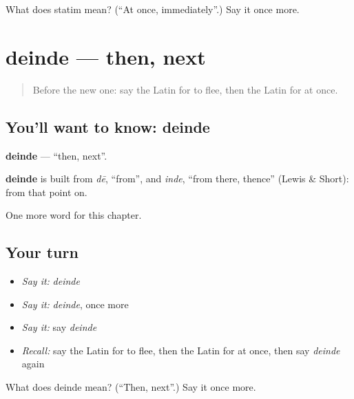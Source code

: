 \begin{tcolorbox}[breakable,colback=teal!4,colframe=teal!35!black,title={Before you move on}]
What does statim mean? (\textquotedblleft{}At once, immediately\textquotedblright{}.) Say it once more.
\end{tcolorbox}
\section[deinde]{deinde — then, next}

\label{lesson:LA-C101-deinde}



\begin{quote}
Before the new one: say the Latin for to flee, then the Latin for at once.
\end{quote}

\subsection*{You'll want to know: deinde}
\textbf{deinde} — \textquotedblleft{}then, next\textquotedblright{}.

\begin{cousinweb}
\textbf{deinde} is built from \emph{dē}, \textquotedblleft{}from\textquotedblright{}, and \emph{inde}, \textquotedblleft{}from there, thence\textquotedblright{} (Lewis \& Short): from that point on.
\end{cousinweb}

\begin{grammarlens}[title={What you've built}]
One more word for this chapter.
\end{grammarlens}

\subsection*{Your turn}
\begin{itemize}
\raggedright
  \item \emph{Say it:} \emph{deinde}
  \item \emph{Say it:} \emph{deinde}, once more
  \item \emph{Say it:} say \emph{deinde}
  \item \emph{Recall:} say the Latin for to flee, then the Latin for at once, then say \emph{deinde} again
\end{itemize}

\begin{tcolorbox}[breakable,colback=teal!4,colframe=teal!35!black,title={Before you move on}]
What does deinde mean? (\textquotedblleft{}Then, next\textquotedblright{}.) Say it once more.
\end{tcolorbox}
